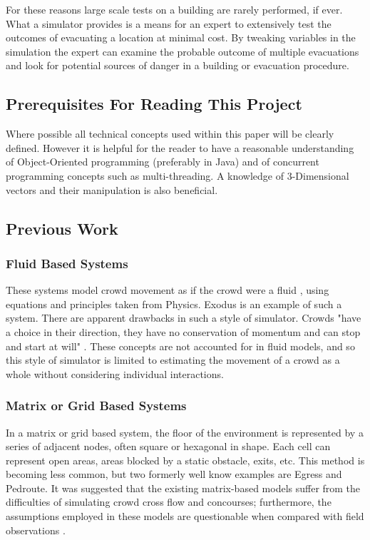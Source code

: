 \documentclass{article}
\begin{document}
For these reasons large scale tests on a building are rarely performed, if ever.
What a simulator provides is a means for an expert to extensively test the outcomes of evacuating a location
at minimal cost. By tweaking variables in the simulation the expert can examine the probable outcome of multiple evacuations
and look for potential sources of danger in a building or evacuation procedure.

\subsection{Prerequisites For Reading This Project}
Where possible all technical concepts used within this paper will be clearly defined. However it is helpful for the reader to have a reasonable
understanding of Object-Oriented programming (preferably in Java) and of concurrent programming concepts such as multi-threading. A knowledge of 3-Dimensional
vectors and their manipulation is also beneficial.

\subsection{Previous Work}
\subsubsection{Fluid Based Systems}
These systems model crowd movement as if the crowd were a fluid \cite{WikipediaFluidMechanics}, using equations and principles taken from Physics. 
Exodus \cite{GaleaNumericalSimulation,GaleaMathModelling} is an example of such a system. There are apparent drawbacks in such a style 
of simulator. Crowds "have a choice in their direction, they have no conservation of momentum and can stop and start at will" \cite{StillCrowdDynamics}. 
These concepts are not accounted for in fluid models, and so this style of simulator is limited to estimating the movement of a crowd as a whole without
considering individual interactions.
\subsubsection{Matrix or Grid Based Systems}
In a matrix or grid based system, the floor of the environment is represented by a series of adjacent nodes, often square or hexagonal in shape. Each 
cell can represent open areas, areas blocked by a static obstacle, exits, etc. This method is becoming less common, but two formerly well know examples are 
Egress and Pedroute. It was suggested that the existing matrix-based models suffer from the
difficulties of simulating crowd cross flow and concourses; furthermore, the
assumptions employed in these models are questionable when compared with field observations \cite{StillCrowdDynamics}.
\end{document}
